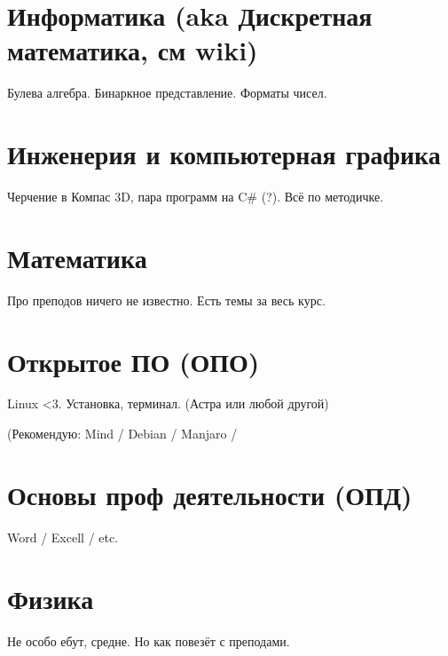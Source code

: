 \documentclass[11pt]{article}
\begin{document}
\section{Информатика (aka Дискретная математика, см wiki)}
\label{sec:orgf2df3da}

Булева алгебра. Бинаркное представление. Форматы чисел. 

\section{Инженерия и компьютерная графика}
\label{sec:org70a8ff8}

Черчение в Компас 3D, пара программ на C\# (?). Всё по методичке.

\section{Математика}
\label{sec:org94af0ef}

Про преподов ничего не известно. Есть темы за весь курс.

\section{Открытое ПО (ОПО)}
\label{sec:org72dc236}

Linux <3. Установка, терминал. (Астра или любой другой)

(Рекомендую: Mind / Debian / Manjaro / 

\section{Основы проф деятельности (ОПД)}
\label{sec:orgf786093}

Word / Excell / etc.

\section{Физика}
\label{sec:org6678802}

Не особо ебут, средне. Но как повезёт с преподами.
\end{document}
